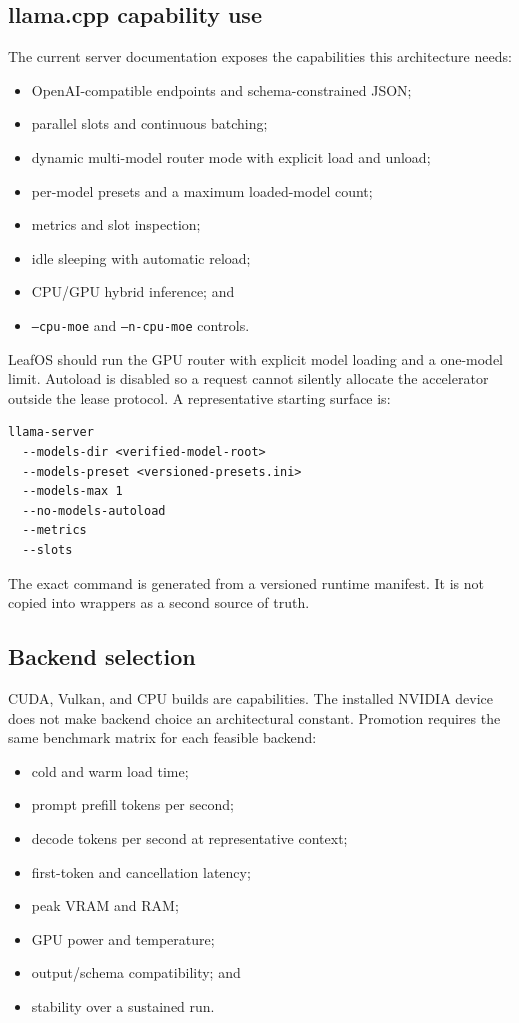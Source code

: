 \documentclass[11pt,letterpaper]{article}
\newcommand{\code}[1]{\texttt{#1}}
\begin{document}
\subsection{llama.cpp capability use}

The current server documentation exposes the capabilities this architecture
needs:

\begin{itemize}
  \item OpenAI-compatible endpoints and schema-constrained JSON;
  \item parallel slots and continuous batching;
  \item dynamic multi-model router mode with explicit load and unload;
  \item per-model presets and a maximum loaded-model count;
  \item metrics and slot inspection;
  \item idle sleeping with automatic reload;
  \item CPU/GPU hybrid inference; and
  \item \code{--cpu-moe} and \code{--n-cpu-moe} controls.
\end{itemize}

LeafOS should run the GPU router with explicit model loading and a one-model
limit. Autoload is disabled so a request cannot silently allocate the
accelerator outside the lease protocol. A representative starting surface is:

\begin{lstlisting}
llama-server
  --models-dir <verified-model-root>
  --models-preset <versioned-presets.ini>
  --models-max 1
  --no-models-autoload
  --metrics
  --slots
\end{lstlisting}

The exact command is generated from a versioned runtime manifest. It is not
copied into wrappers as a second source of truth.

\subsection{Backend selection}

CUDA, Vulkan, and CPU builds are capabilities. The installed NVIDIA device
does not make backend choice an architectural constant. Promotion requires the
same benchmark matrix for each feasible backend:

\begin{itemize}
  \item cold and warm load time;
  \item prompt prefill tokens per second;
  \item decode tokens per second at representative context;
  \item first-token and cancellation latency;
  \item peak VRAM and RAM;
  \item GPU power and temperature;
  \item output/schema compatibility; and
  \item stability over a sustained run.
\end{itemize}
\end{document}

